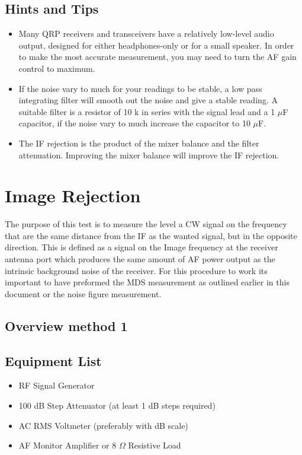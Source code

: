 \documentclass[10pt,letterpaper]{book}
\begin{document}
\subsection*{Hints and Tips}
\begin{itemize}
	\item Many QRP receivers and transceivers have a relatively low-level audio output, designed for either headphones-only or for a small speaker. In order to make the most accurate measurement, you may need to turn the AF gain control to maximum.
	\item If the noise vary to much for your readings to be stable, a low pass integrating filter will smooth out the noise and give a stable reading. A suitable filter is a resistor of 10 k in series with the signal lead and a 1 $\mu$F capacitor, if the noise vary to much increase the capacitor to 10 $\mu$F.  
	\item The IF rejection is the product of the mixer balance and the filter attenuation. Improving the mixer balance will improve the IF rejection.
\end{itemize}
\newpage

\section{Image Rejection}
The purpose of this test is to measure the level a CW signal on the frequency that are the same distance from the IF as the wanted signal, but in the opposite direction. 
This is defined as a signal on the Image frequency at the receiver antenna port which produces the same amount of AF power output as the intrinsic background noise of the receiver.  For this procedure to work its important to have preformed the MDS measurement as outlined earlier in this document or the noise figure measurement.
\subsection*{Overview method 1}
\subsection*{Equipment List}
\begin{itemize}
	\item RF Signal Generator
	\item 100 dB Step Attenuator (at least 1 dB steps required)
	\item AC RMS Voltmeter (preferably with dB scale)
	\item AF Monitor Amplifier or 8 $\Omega$ Resistive Load
\end{itemize}
\end{document}

